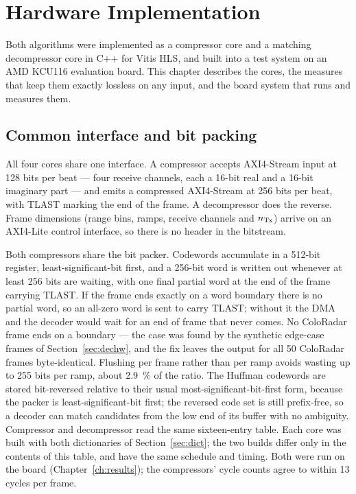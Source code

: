 \chapter{Hardware Implementation}
\label{ch:hardware}

Both algorithms were implemented as a compressor core and a matching
decompressor core in C++ for Vitis HLS, and built into a test system on an AMD
KCU116 evaluation board. This chapter describes the cores, the measures that
keep them exactly lossless on any input, and the board system that runs and
measures them.

\section{Common interface and bit packing}
\label{sec:interface}

All four cores share one interface. A compressor accepts AXI4-Stream input at
\num{128} bits per beat --- four receive channels, each a 16-bit real and a
16-bit imaginary part --- and emits a compressed AXI4-Stream at \num{256} bits
per beat, with TLAST marking the end of the frame. A decompressor does the
reverse. Frame dimensions (range bins, ramps, receive channels and $n_{\mathrm{Tx}}$)
arrive on an AXI4-Lite control interface, so there is no header in the
bitstream.

Both compressors share the bit packer. Codewords accumulate in a 512-bit
register, least-significant-bit first, and a 256-bit word is written out
whenever at least 256 bits are waiting, with one final partial word at the end
of the frame carrying TLAST. If the frame ends exactly on a word boundary there
is no partial word, so an all-zero word is sent to carry TLAST; without it the
DMA and the decoder would wait for an end of frame that never comes. No
ColoRadar frame ends on a boundary --- the case was found by the synthetic
edge-case frames of Section~\ref{sec:dechw}, and the fix leaves the output for
all 50 ColoRadar frames byte-identical. Flushing per frame rather than per ramp avoids wasting up to 255
bits per ramp, about \SI{2.9}{\percent} of the ratio. The Huffman codewords are
stored bit-reversed relative to their usual most-significant-bit-first form,
because the packer is least-significant-bit first; the reversed code set is
still prefix-free, so a decoder can match candidates from the low end of its
buffer with no ambiguity. Compressor and decompressor read the same
sixteen-entry table. Each core was built with both dictionaries of
Section~\ref{sec:dict}; the two builds differ only in the contents of this table,
and have the same schedule and timing. Both were run on the board
(Chapter~\ref{ch:results}); the compressors' cycle counts agree to within 13
cycles per frame.

